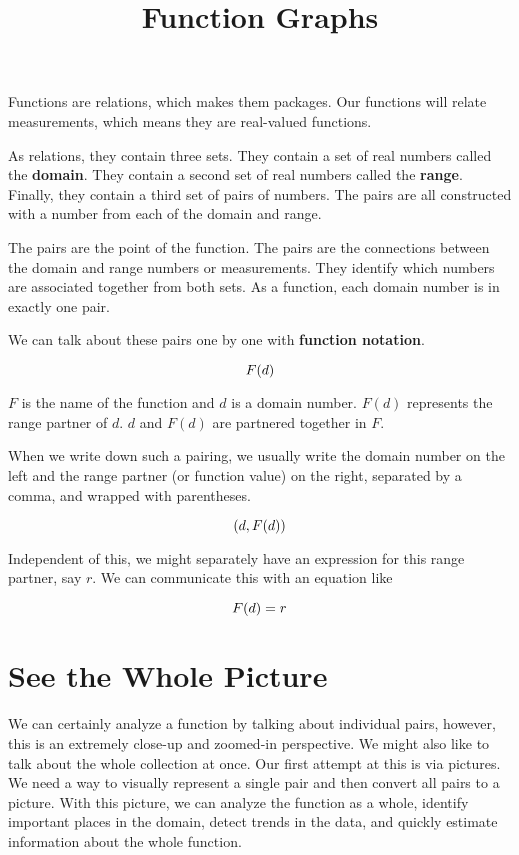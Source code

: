 \documentclass{ximera}
\title{Function Graphs}
\begin{document}
\begin{abstract}

\end{abstract}
\maketitle


Functions are relations, which makes them packages.  Our functions will relate measurements, which means they are real-valued functions.



As relations, they contain three sets.  They contain a set of real numbers called the \textbf{domain}.  They contain a second set of real numbers called the \textbf{range}. Finally, they contain a third set of pairs of numbers.  The pairs are all constructed with a number from each of the domain and range.

The pairs are the point of the function.  The pairs are the connections between the domain and range numbers or measurements.  They identify which numbers are associated together from both sets. As a function, each domain number is in exactly one pair.

We can talk about these pairs one by one with \textbf{function notation}.

\[
\large{F(d)}
\]


$F$ is the name of the function and $d$ is a domain number.  $F(d)$ represents the range partner of $d$.  $d$ and $F(d)$ are partnered together in $F$.

When we write down such a pairing, we usually write the domain number on the left and the range partner (or function value) on the right, separated by a comma, and wrapped with parentheses.

\[ 
\large{(d, F(d))} 
\]

Independent of this, we might separately have an expression for this range partner, say $r$.  We can communicate this with an equation like


\[
\large{F(d) = r}
\]


\section{See the Whole Picture}

We can certainly analyze a function by talking about individual pairs, however, this is an extremely close-up and zoomed-in perspective. We might also like to talk about the whole collection at once.  Our first attempt at this is via pictures. We need a way to visually represent a single pair and then convert all pairs to a picture.  With this picture, we can analyze the function as a whole, identify important places in the domain, detect trends in the data, and quickly estimate information about the whole function.
\end{document}
